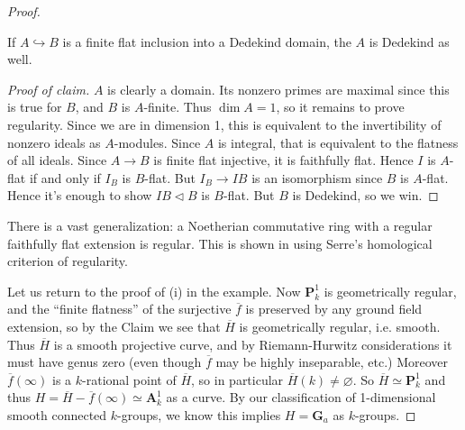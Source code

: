 \documentclass[10pt]{article}
\renewcommand{\(}{\left(}
\renewcommand{\)}{\right)}
\numberwithin{thm}{subsection}
\begin{document}
\begin{ex}
\begin{proof}
\begin{claim}
If $A\hookrightarrow B$ is a finite flat inclusion into a Dedekind domain, the $A$ is Dedekind as well.
\end{claim}
\begin{proof}[Proof of claim]
 $A$ is clearly a domain.
Its nonzero primes are maximal since this is true for $B$, and $B$ is $A$-finite.
Thus $\dim A = 1$, so it remains to prove regularity.
Since we are in dimension 1, this is equivalent to the invertibility of nonzero ideals as $A$-modules.
Since $A$ is integral, that is equivalent to the flatness of
all ideals. Since $A\rightarrow B$ is finite flat injective,
it is faithfully flat.
Hence $I$ is $A$-flat if and only if $I_B$ is $B$-flat.
But $I_B \rightarrow IB$ is an isomorphism
since $B$ is $A$-flat.
Hence it's enough to show $IB\vartriangleleft B$ is $B$-flat.
But $B$ is Dedekind, so we win.
\end{proof}
\begin{rem}\label{}
There is a vast generalization: a Noetherian commutative ring with a regular faithfully flat extension is regular. 
This is shown in \cite[23.7(i)]{crt} using Serre's homological criterion of regularity.
\end{rem}

Let us return to the proof of (i) in the example.
 Now $\mathbf{P}^1_k$ is geometrically regular, 
 and the ``finite flatness'' of the surjective $\overline{f}$ is preserved by any ground field extension, 
so by the Claim we see that $\overline{H}$ is geometrically regular, i.e. smooth.
Thus $\overline{H}$ is a smooth projective curve,
and by Riemann-Hurwitz considerations it must have genus zero 
(even though $\overline{f}$ may be highly inseparable, etc.)
Moreover $\overline{f}(\infty)$ is a $k$-rational point
of $\overline{H}$, so in particular $\overline{H}(k)\neq\varnothing$.
So $\overline{H}\simeq \mathbf{P}^1_k$
and thus $H=\overline{H}-\overline{f}(\infty)\simeq \mathbf{A}^1_k$
as a curve. By our classification of 1-dimensional smooth connected $k$-groups,
we know this implies $H=\mathbf{G}_a$ as $k$-groups.
\end{proof}
\end{ex}
\end{document}
